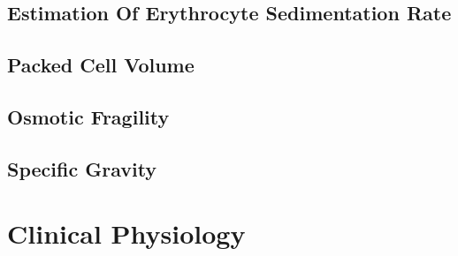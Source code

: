 \documentclass[a4paper,12pt]{book}
\begin{document}
\chapter*{\centering Estimation Of Erythrocyte Sedimentation Rate}
\chapter*{\centering Packed Cell Volume}
\chapter*{\centering Osmotic Fragility}
\chapter*{\centering Specific Gravity}

\part{Clinical Physiology}
\end{document}
